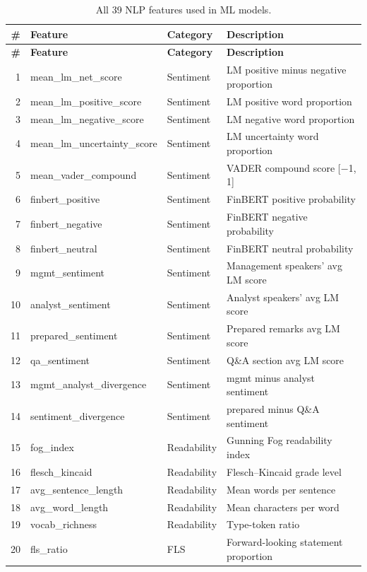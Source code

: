 \documentclass[12pt,a4paper]{article}
\begin{document}
\begin{longtable}{@{}rllp{6.5cm}@{}}
\caption{All 39 NLP features used in ML models.} \label{tab:all-features} \\
\toprule
\textbf{\#} & \textbf{Feature} & \textbf{Category} & \textbf{Description} \\
\midrule
\endfirsthead
\toprule
\textbf{\#} & \textbf{Feature} & \textbf{Category} & \textbf{Description} \\
\midrule
\endhead
1 & mean\_lm\_net\_score & Sentiment & LM positive minus negative proportion \\
2 & mean\_lm\_positive\_score & Sentiment & LM positive word proportion \\
3 & mean\_lm\_negative\_score & Sentiment & LM negative word proportion \\
4 & mean\_lm\_uncertainty\_score & Sentiment & LM uncertainty word proportion \\
5 & mean\_vader\_compound & Sentiment & VADER compound score [$-$1, 1] \\
6 & finbert\_positive & Sentiment & FinBERT positive probability \\
7 & finbert\_negative & Sentiment & FinBERT negative probability \\
8 & finbert\_neutral & Sentiment & FinBERT neutral probability \\
9 & mgmt\_sentiment & Sentiment & Management speakers' avg LM score \\
10 & analyst\_sentiment & Sentiment & Analyst speakers' avg LM score \\
11 & prepared\_sentiment & Sentiment & Prepared remarks avg LM score \\
12 & qa\_sentiment & Sentiment & Q\&A section avg LM score \\
13 & mgmt\_analyst\_divergence & Sentiment & mgmt minus analyst sentiment \\
14 & sentiment\_divergence & Sentiment & prepared minus Q\&A sentiment \\
15 & fog\_index & Readability & Gunning Fog readability index \\
16 & flesch\_kincaid & Readability & Flesch--Kincaid grade level \\
17 & avg\_sentence\_length & Readability & Mean words per sentence \\
18 & avg\_word\_length & Readability & Mean characters per word \\
19 & vocab\_richness & Readability & Type-token ratio \\
20 & fls\_ratio & FLS & Forward-looking statement proportion \\

\end{longtable}
\end{document}
